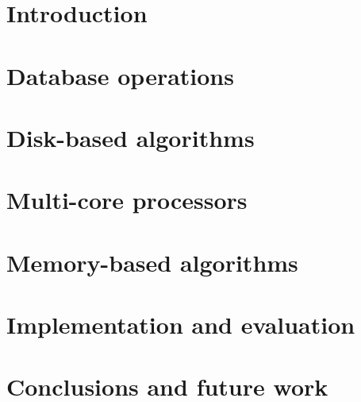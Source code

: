 \documentclass[11pt,a4paper,twoside]{report}
\begin{document}
\cleardoublepage
\begin{titlepage}

\end{titlepage}

\cleardoublepage
\begin{titlepage}

\end{titlepage}

\cleardoublepage
\tableofcontents
\thispagestyle{empty}

\cleardoublepage
\setcounter{page}{1}
\chapter{Introduction}


\cleardoublepage
\chapter{Database operations}


\cleardoublepage
\chapter{Disk-based algorithms}
\label{chap:disk-based-algorithms}


\cleardoublepage
\chapter{Multi-core processors}


\cleardoublepage
\chapter{Memory-based algorithms}
\label{chap:memory-based-algorithms}


\cleardoublepage
\chapter{Implementation and evaluation}
\label{chap:implementation-and-evaluation}


\cleardoublepage
\chapter{Conclusions and future work}

 
\cleardoublepage



\end{document}
